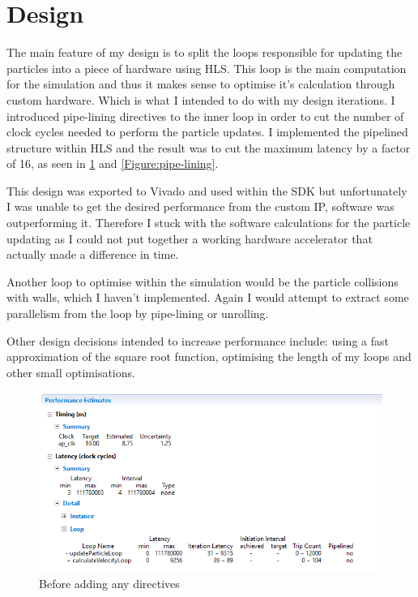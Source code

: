 \documentclass[12pt]{article} %
\begin{document}
\section{Design} %


The main feature of my design is to split the loops responsible for updating the particles into a piece of hardware using HLS. This loop is the main computation for the simulation and thus it makes sense to optimise it's calculation through custom hardware. Which is what I intended to do with my design iterations. I introduced pipe-lining directives to the inner loop in order to cut the number of clock cycles needed to perform the particle updates. I implemented the pipelined structure within HLS and the result was to cut the maximum latency by a factor of 16, as seen in \cref{Figure:default} and \cref{Figure:pipe-lining}.
	
This design was exported to Vivado and used within the SDK but unfortunately I was unable to get the desired performance from the custom IP, software was outperforming it. Therefore I stuck with the software calculations for the particle updating as I could not put together a working hardware accelerator that actually made a difference in time.

Another loop to optimise within the simulation would be the particle collisions with walls, which I haven't implemented. Again I would attempt to extract some parallelism from the loop by pipe-lining or unrolling.
	
Other design decisions intended to increase performance include: using a fast approximation of the square root function, optimising the length of my loops and other small optimisations.
	
\begin{figure}[h!]
  \centering
  \includegraphics[width=\linewidth]{figures/default.jpg}
  \caption{Before adding any directives}
  \label{Figure:default}
\end{figure}
	
\end{document}

